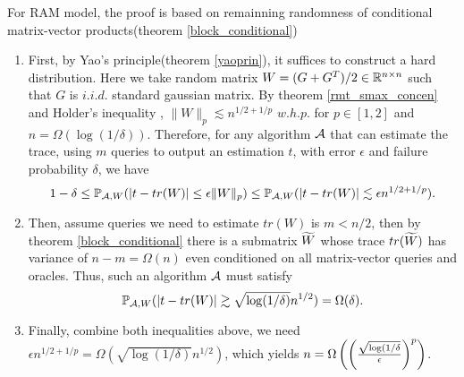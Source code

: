 {\begin{itemize}
\begin{enumerate}
    \end{enumerate} 
For RAM model, the proof is based on remainning randomness of conditional matrix-vector products(theorem \ref{block_conditional})
\begin{enumerate}
    \item First, by Yao's principle(theorem \ref{yaoprin}), it suffices to construct a hard distribution. Here we take random matrix
     $W=(G+G^T)/2\in\mathbb{R}^{n\times n}$ such that $G$ is $i.i.d.$ standard gaussian matrix. By theorem \ref{rmt_smax_concen} and Holder's inequality
     , $\|W\|_p\lesssim n^{1/2+1/p}$ $w.h.p.$ for $p\in[1,2]$ and $n=\Omega(\log(1/\delta))$. Therefore, 
     for any algorithm $\mathcal{A}$ that
     can estimate the trace, using $m$ queries to output an estimation $t$, with error $\epsilon$ and failure probability $\delta$, we have
     \[
        1-\delta\le \mathbb{P}_{\mathcal{A}, W}(|t-tr(W)|\le\epsilon\|W\|_p)\le \mathbb{P}_{\mathcal{A}, W}(|t-tr(W)|\lesssim\epsilon n^{1/2+1/p}).   
     \]
     \item Then, assume queries we need to estimate $tr(W)$ is $m<n/2$, then by theorem \ref{block_conditional} there is a submatrix $\widetilde{W}$
     whose trace $tr(\widetilde{W})$ has variance of $n-m=\Omega(n)$ even conditioned on all matrix-vector queries and oracles. Thus, such an algorithm $\mathcal{A}$ must satisfy
     $$\mathbb{P}_{\mathcal{A}, W}(|t-tr(W)|\gtrsim \sqrt{\log(1/\delta)}n^{1/2})=\Omega(\delta).$$
     \item Finally, combine both inequalities above, we need $\epsilon n^{1/2+1/p}=\Omega(\sqrt{\log(1/\delta)}n^{1/2})$, which yields $n=\Omega\left(\left(\frac{\sqrt{\log(1/\delta}}{\epsilon}\right)^p\right)$.
    
\end{enumerate}
    
\end{itemize}
}


